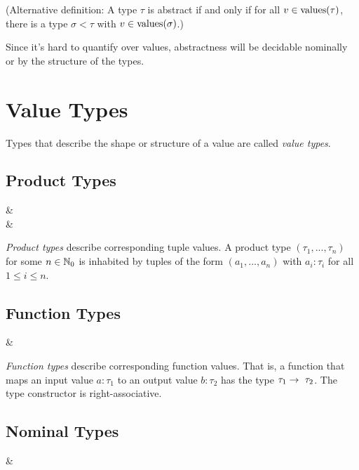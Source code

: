 (Alternative definition: A type $\tau$ is abstract if and only if for all $v \in \operatorname{values}(\tau)$, there is a type $\sigma < \tau$ with $v \in \operatorname{values}(\sigma)$.)

Since it's hard to quantify over values, abstractness will be decidable nominally or by the structure of the types.



\section{Value Types}

Types that describe the shape or structure of a value are called \textit{value types}.


\subsection{Product Types}

\begin{grammar}
 &\produce {} \\
 &\produce {}
\end{grammar}

\noindent \textit{Product types} describe corresponding tuple values. A product type $(\tau_1, ..., \tau_n)$ for some $n \in \mathbb{N}_0$ is inhabited by tuples of the form $(a_1, ..., a_n)$ with $a_i : \tau_i$ for all $1 \leq i \leq n$.


\subsection{Function Types}

\begin{grammar}
 &\produce {}
\end{grammar}

\noindent \textit{Function types} describe corresponding function values. That is, a function that maps an input value $a : \tau_1$ to an output value $b : \tau_2$ has the type $\tau_1 \fto \tau_2$. The type constructor is right-associative.


\subsection{Nominal Types}

\begin{grammar}
 &\produce {}
\end{grammar}

